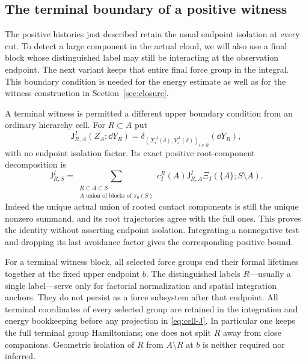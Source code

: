 \subsection{The terminal boundary of a positive witness}

The positive histories just described retain the usual endpoint
isolation at every cut.  To detect a large component in the actual
cloud, we will also use a final block whose distinguished label may
still be interacting at the observation endpoint.  The next variant
keeps that entire final force group in the integral.  This boundary
condition is needed for the energy estimate as well as for the
witness construction in Section~\ref{sec:closure}.

\begin{definition}
\label{def:cell-terminal-witness}
A terminal witness is permitted a different upper boundary condition
from an ordinary hierarchy cell.  For $R\subset A$ put
\begin{equation}
 \mathsf J^I_{R,A}(Z_A;\dd Y_R)
   =\delta_{(X_i^A(\delta),V_i^A(\delta))_{i\in R}}(\dd Y_R),
 \label{eq:cell-J}
\end{equation}
with no endpoint isolation factor.  Its exact positive root-component
decomposition is
\begin{equation}
 \mathsf J^I_{R,S}
  =\sum_{\substack{R\subset A\subset S\\
                   A\text{ union of blocks of }\pi_0(S)}}
      c_I^R(A)\mathsf J^I_{R,A}\Xi_I(\{A\};S\setminus A).
 \label{eq:cell-unisolated-root-decomposition}
\end{equation}
Indeed the unique actual union of rooted contact components is still
the unique nonzero summand, and its root trajectories agree with the
full ones.  This proves the identity without asserting endpoint
isolation.  Integrating a nonnegative test and dropping its last
avoidance factor gives the corresponding positive bound.

For a terminal witness block, all selected force groups end their
formal lifetimes together at the fixed upper endpoint $b$.  The
distinguished labels $R$---usually a single label---serve only for
factorial normalization and spatial integration anchors.  They do
not persist as a force subsystem after that endpoint.  All terminal
coordinates of every selected group are retained in the integration
and energy bookkeeping before any projection in
\eqref{eq:cell-J}.  In particular one keeps the full terminal group
Hamiltonians; one does not split $R$ away from close companions.
Geometric isolation of $R$ from $A\setminus R$ at $b$ is neither
required nor inferred.


\end{definition}
